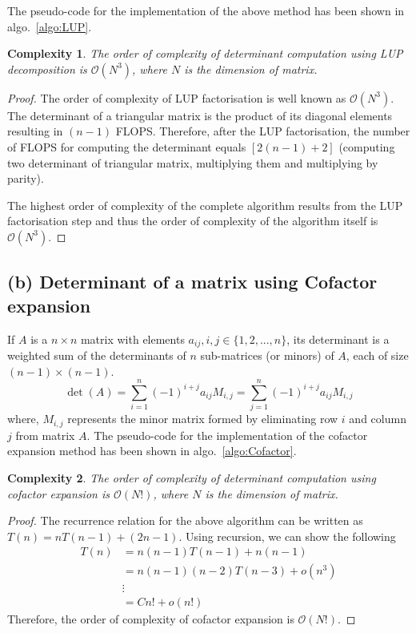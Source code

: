 \documentclass[11pt, oneside]{article}
\newtheorem*{order}{Complexity}
\begin{document}
  The pseudo-code for the implementation of the above method has been shown in algo.~\ref{algo:LUP}.
  

  \begin{order}
    The order of complexity of determinant computation using LUP decomposition is $\mathcal{O}(N^3)$, where $N$ is the dimension of matrix.
  \end{order}
  \begin{proof}
    The order of complexity of LUP factorisation is well known as $\mathcal{O}(N^3)$. The determinant of a triangular matrix is the product of its diagonal elements resulting in $(n-1)$ FLOPS. Therefore, after the LUP factorisation, the number of FLOPS for computing the determinant equals $[2(n-1)+2]$ (computing two determinant of triangular matrix, multiplying them and multiplying by parity).

    The highest order of complexity of the complete algorithm results from the LUP factorisation step and thus the order of complexity of the algorithm itself is $\mathcal{O}(N^3)$.
  \end{proof}

\subsection*{(b) Determinant of a matrix using Cofactor expansion}
If $A$ is a $n\times n$ matrix with elements $a_{ij}, i,j \in \{1,2,...,n\}$, its determinant is a weighted sum of the determinants of $n$ sub-matrices (or minors) of $A$, each of size $(n-1)\times (n-1)$.
\begin{equation*}
  \det (A) = \sum_{i=1}^{n} (-1)^{i+j} a_{ij}M_{i,j} = \sum_{j=1}^{n} (-1)^{i+j} a_{ij}M_{i,j}
\end{equation*}
where, $M_{i,j}$ represents the minor matrix formed by eliminating row $i$ and column $j$ from matrix $A$.
The pseudo-code for the implementation of the cofactor expansion method has been shown in algo.~\ref{algo:Cofactor}.


\begin{order}
  The order of complexity of determinant computation using cofactor expansion is $\mathcal{O}(N!)$, where $N$ is the dimension of matrix.
\end{order}
\begin{proof}
  The recurrence relation for the above algorithm can be written as $T(n) = n T(n-1) + (2n - 1)$. Using recursion, we can show the following
  \begin{align*}
    T(n) &= n (n-1) T(n-1) + n (n-1)\\
         &= n(n-1)(n-2)T(n-3) + o(n^3)\\
         & \vdots\\
         &= C n! + o(n!)
  \end{align*}
  Therefore, the order of complexity of cofactor expansion is $\mathcal{O}(N!)$.
\end{proof}
\end{document}
